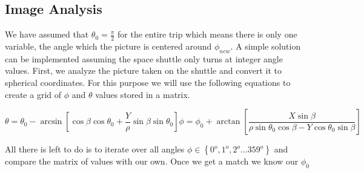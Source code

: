 \documentclass[reprint,english,notitlepage]{revtex4-2}
\begin{document}
\subsection{Image Analysis} \label{ssec: image analysis}
We have assumed that $ \theta_{0} = \frac{\pi}{2} $ for the entire trip which means there is only one variable, the angle which the picture is centered around $ ϕ _{new} $. A simple solution can be implemented assuming the space shuttle only turns at integer angle values. First, we analyze the picture taken on the shuttle and convert it to spherical coordinates. For this purpose we will use the following equations to create a grid of $ \phi $ and $ \theta $ values stored in a matrix.

\begin{subequations} \label{eq: planar to spherical coordinates}
  \begin{equation}
	\theta = \theta_0 - \arcsin \left[ \cos β \cos θ _{0} + \frac{Y}{\rho} \sin β \sin θ _{0}\right] 
  \end{equation}
  \begin{equation}
	\phi = \phi _{0} + \arctan \left[ \frac{X \sin \beta}{\rho \sin \theta _{0} \cos \beta - Y \cos  \theta _{0} \sin  \beta} \right] 
  \end{equation}
\end{subequations}

All there is left to do is to iterate over all angles $ \phi \in  \left\{ 0^{o}, 1^{o}, 2^{o} \dots 359 ^{o} \right\}  $ and compare the matrix of values with our own. Once we get a match we know our $ \phi _{0} $
\end{document}

